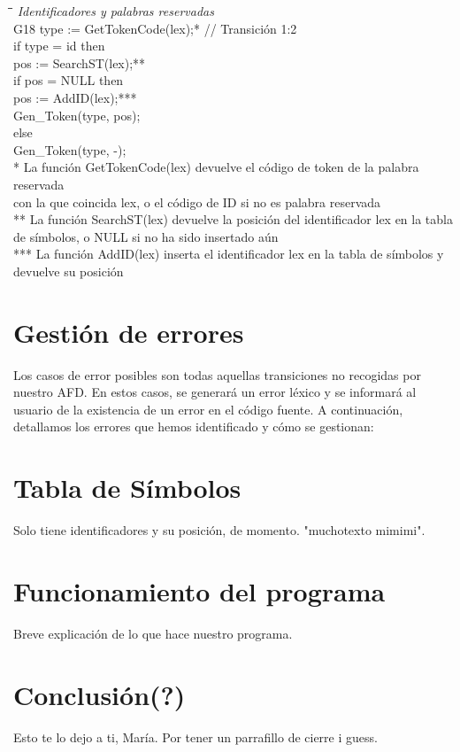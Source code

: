 \documentclass{article}
\begin{document}
\newpage
\begin{tabbing}
    \hspace{1cm}\=\hspace{1cm}\=\hspace{7cm}\=\kill
    \textit{Identificadores y palabras reservadas} \\
    \> G18 \> type := GetTokenCode(lex);*\> // Transición 1:2\\
    \> \hspace{1cm}if type = id then\\
    \> \hspace{2cm}pos := SearchST(lex);**\\
    \> \hspace{2cm}if pos = NULL then\\
    \> \hspace{3cm}pos := AddID(lex);***\\
    \> \hspace{2cm}Gen\_Token(type, pos);\\
    \> \hspace{1cm}else\\
    \> \hspace{2cm}Gen\_Token(type, -);\\
    \>* La función GetTokenCode(lex) devuelve el código de token de la palabra reservada \\
    \>con la que coincida lex, o el código de ID si no es palabra reservada\\
    \>** La función SearchST(lex) devuelve la posición del identificador lex en la tabla \\
    \>de símbolos, o NULL si no ha sido insertado aún\\
    \>*** La función AddID(lex) inserta el identificador lex en la tabla de símbolos y \\
    \>devuelve su posición\\
\end{tabbing}

\section{Gestión de errores}
Los casos de error posibles son todas aquellas transiciones no recogidas por nuestro AFD. En estos casos, se generará un error léxico y se informará al usuario de la existencia de un error en el código fuente. A continuación, detallamos los errores que hemos identificado y cómo se gestionan:\\

\section{Tabla de Símbolos}
Solo tiene identificadores y su posición, de momento. "muchotexto mimimi".

\section{Funcionamiento del programa}
Breve explicación de lo que hace nuestro programa.
\section{Conclusión(?)}
Esto te lo dejo a ti, María. Por tener un parrafillo de cierre i guess.
\end{document}
